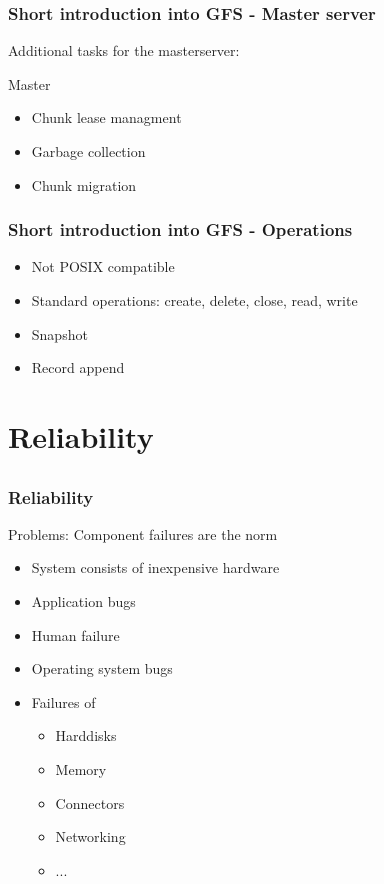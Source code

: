 \documentclass[notes=hide,yellow]{beamer}
\begin{document}
\begin{frame}
	\frametitle{Short introduction into GFS - Master server}
	Additional tasks for the masterserver:	
	\begin{block}{Master}
	\begin{itemize}
		\item Chunk lease managment %
		\item Garbage collection
		\item Chunk migration
	\end{itemize}
	\end{block}
\end{frame}

\begin{frame}
	\frametitle{Short introduction into GFS - Operations}
	\begin{itemize}
		\item Not POSIX compatible
		\item Standard operations: create, delete, close, read, write
		\item Snapshot %
		\item Record append
	\end{itemize}
\end{frame}

\section{Reliability}
\subsection*{}
\begin{frame}
	\frametitle{Reliability}
	Problems: Component failures are the norm
	
	\begin{itemize}
		\item System consists of inexpensive hardware 	
		\item Application bugs %
		\item Human failure %
		\item Operating system bugs %
		\item Failures of 
		\begin{itemize}
			\item Harddisks
			\item Memory
			\item Connectors
			\item Networking
			\item ...
		\end{itemize}
	\end{itemize}		
	
\end{frame}
\end{document}
